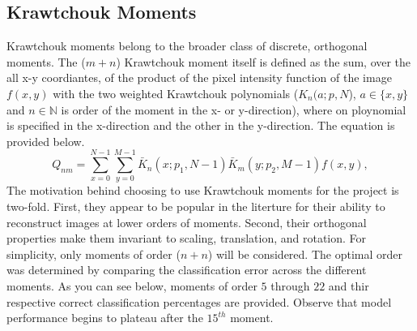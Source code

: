 \documentclass[12pt]{article}
\begin{document}
\subsection{Krawtchouk Moments}
Krawtchouk moments belong to the broader class of discrete, orthogonal moments. The ($m+n$) Krawtchouk moment itself is defined as the sum, over the all x-y coordiantes, of the product of the pixel intensity function of the image $f(x,y)$ with the two weighted Krawtchouk polynomials ($K_n(a;p,N$), $a\in \{x,y\}$ and $n\in \mathbb{N}$ is order of the moment in the x- or y-direction), where on ploynomial is specified in the x-direction and the other in the y-direction. The equation is provided below.
\begin{equation*}
Q_{nm} = \sum_{x=0}^{N-1}\sum_{y=0}^{M-1}\bar{K}_n(x;p_1,N-1)\bar{K}_m(y;p_2,M-1)f(x,y),
\end{equation*}
The motivation behind choosing to use Krawtchouk moments for the project is two-fold. First, they appear to be popular in the literture for their ability to reconstruct images at lower orders of moments. Second, their orthogonal properties make them invariant to scaling, translation, and rotation. For simplicity, only moments of order ($n+n$) will be considered. The optimal order was determined by comparing the classification error across the different moments. As you can see below, moments of order $5$ through $22$ and thir respective correct classification percentages are provided. Observe that model performance begins to plateau after the $15^{th}$ moment.
\begin{figure}[h]
	\begin{center}	
	\end{center}
\end{figure} 
\end{document}
